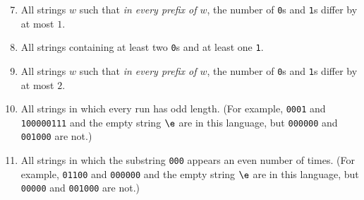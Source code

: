 \documentclass[11pt]{article}
\def\Sym#1{\texttt{\color{BrickRed}#1}}
\begin{document}
\begin{enumerate}
\setcounter{enumi}{6}

\item
All strings $w$ such that \emph{in every prefix of $w$}, the number of \Sym0s and \Sym1s differ by at most $1$.

\item
All strings containing at least two \Sym0s and at least one \Sym1.

\item
All strings $w$ such that \emph{in every prefix of $w$}, the number of \Sym0s and \Sym1s differ by at most $2$.

\item
All strings in which every run has odd length.  (For example, \Sym{0001} and \Sym{100000111} and the empty string $\e$ are in this language, but \Sym{000000} and \Sym{001000} are not.)

\Hard
\item
All strings in which the substring \Sym{000} appears an even number of times.
(For example, \Sym{01100} and \Sym{000000} and the empty string $\e$ are in this language, but \Sym{00000} and \Sym{001000} are not.)

\end{enumerate}
\end{document}
